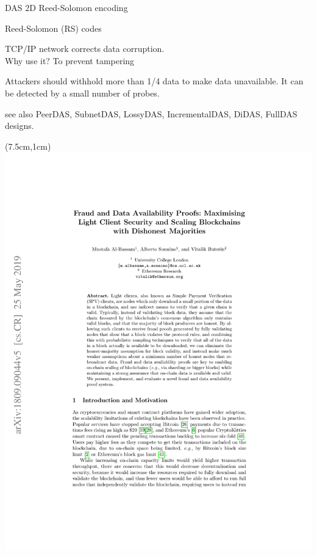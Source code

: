 \documentclass[10pt]{beamer}
\begin{document}
\begin{frame}[b,fragile]{DAS}
2D Reed-Solomon encoding

Reed-Solomon (RS) codes

TCP/IP network corrects data corruption. \\
Why use it? To prevent tampering

Attackers should withhold more than 1/4 data to make data unavailable.
It can be detected by a small number of probes.

see also PeerDAS, SubnetDAS, LossyDAS, IncrementalDAS, DiDAS, FullDAS designs.
\begin{textblock*}{10cm}(7.5cm,1cm)
\includegraphics[page=13,trim={7cm 5.8cm 7cm 14cm},clip,scale=0.70]{fraud-and-data-availability-proofs.pdf}
\end{textblock*}
\end{frame}
\end{document}
